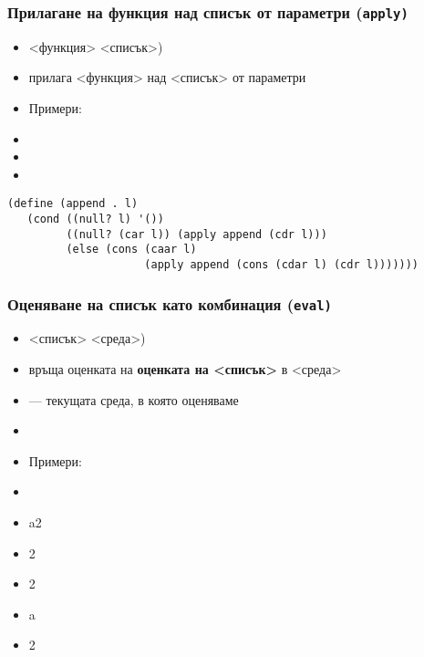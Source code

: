 \documentclass{beamer}
\begin{document}
\begin{frame}[fragile]
  \frametitle{Прилагане на функция над списък от параметри (\tt{apply})}

  \begin{itemize}[<+->]
  \item {}<функция> <списък>\tta)
  \item прилага <функция> над <списък> от параметри
  \item Примери:
  \item {}
  \item {}
  \item {}
  \end{itemize}
  \onslide<+->
\small
\begin{lstlisting}
(define (append . l)
   (cond ((null? l) '())
         ((null? (car l)) (apply append (cdr l)))
         (else (cons (caar l)
                     (apply append (cons (cdar l) (cdr l)))))))
\end{lstlisting}
\end{frame}

\begin{frame}
  \frametitle{Оценяване на списък като комбинация (\tt{eval})}

  \begin{itemize}[<+->]
  \item {}<списък> <среда>\tta)
  \item връща оценката на \textbf{оценката на <списък>} в <среда>
  \item {} --- текущата среда, в която оценяваме
  \item {}
  \item Примери:
  \item {}
  \item \evalsto a2
  \item {}2
  \item {}2
  \item {}a
  \item {}2
  \end{itemize}
\end{frame}
\end{document}
